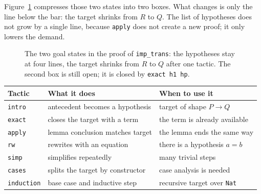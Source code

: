 Figure~\ref{fig:dua-keadaan} compresses those two states into two boxes. What changes is only the
line below the bar: the target shrinks from $R$ to $Q$. The list of hypotheses does not grow by a
single line, because \texttt{apply} does not create a new proof; it only lowers the demand.

\begin{figure}[htbp]
\centering
{}
\caption{The two goal states in the proof of \texttt{imp\_trans}: the hypotheses stay at four lines,
the target shrinks from $R$ to $Q$ after one tactic. The second box is still open; it is closed by
\texttt{exact h1 hp}.}
\label{fig:dua-keadaan}
\end{figure}

\begin{center}
\begin{tabular}{lll}
\hline
Tactic & What it does & When to use it \\
\hline
\texttt{intro}     & antecedent becomes a hypothesis   & target of shape $P\to Q$ \\
\texttt{exact}     & closes the target with a term    & the term is already available \\
\texttt{apply}     & lemma conclusion matches target & the lemma ends the same way \\
\texttt{rw}        & rewrites with an equation & there is a hypothesis $a=b$ \\
\texttt{simp}      & simplifies repeatedly      & many trivial steps \\
\texttt{cases}     & splits the target by constructor & case analysis is needed \\
\texttt{induction} & base case and inductive step     & recursive target over \texttt{Nat} \\
\hline
\end{tabular}
\end{center}

